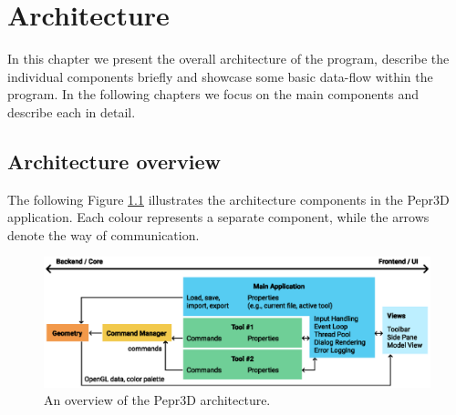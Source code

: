 \chapter{Architecture}

In this chapter we present the overall architecture of the program, describe the individual components briefly and showcase some basic data-flow within the program. In the following chapters we focus on the main components and describe each in detail.



\section{Architecture overview}

The following Figure \ref{fig:architecture} illustrates the architecture components in the Pepr3D application. Each colour represents a separate component, while the arrows denote the way of communication.

\vspace{20pt}

\begin{figure}[h]
	\centering
	\centerline{\includegraphics[scale=0.9]{images/diagram.eps}}
	\caption{An overview of the Pepr3D architecture.}
	\label{fig:architecture}
\end{figure}

